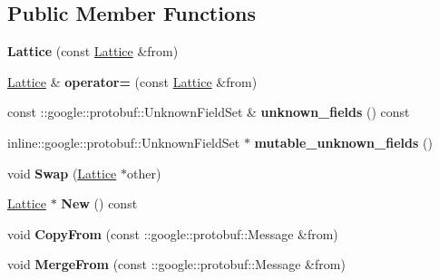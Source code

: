 \subsection*{Public Member Functions}
\begin{DoxyCompactItemize}
\item 
\hypertarget{classlattice_1_1Lattice_a6afe3eb36c5fa648ee09ff3425544a9f}{
{\bfseries Lattice} (const \hyperlink{classlattice_1_1Lattice}{Lattice} \&from)}
\label{classlattice_1_1Lattice_a6afe3eb36c5fa648ee09ff3425544a9f}

\item 
\hypertarget{classlattice_1_1Lattice_aaa4fc56dd3fca09222c685f78e2c5632}{
\hyperlink{classlattice_1_1Lattice}{Lattice} \& {\bfseries operator=} (const \hyperlink{classlattice_1_1Lattice}{Lattice} \&from)}
\label{classlattice_1_1Lattice_aaa4fc56dd3fca09222c685f78e2c5632}

\item 
\hypertarget{classlattice_1_1Lattice_afc9d0408a25d079574a8da841f4d2580}{
const ::google::protobuf::UnknownFieldSet \& {\bfseries unknown\_\-fields} () const }
\label{classlattice_1_1Lattice_afc9d0408a25d079574a8da841f4d2580}

\item 
\hypertarget{classlattice_1_1Lattice_a5581cb64b246c378c56bb2d686e42132}{
inline::google::protobuf::UnknownFieldSet $\ast$ {\bfseries mutable\_\-unknown\_\-fields} ()}
\label{classlattice_1_1Lattice_a5581cb64b246c378c56bb2d686e42132}

\item 
\hypertarget{classlattice_1_1Lattice_ab4a3958ab2281dfb4677e6b7998b5ff3}{
void {\bfseries Swap} (\hyperlink{classlattice_1_1Lattice}{Lattice} $\ast$other)}
\label{classlattice_1_1Lattice_ab4a3958ab2281dfb4677e6b7998b5ff3}

\item 
\hypertarget{classlattice_1_1Lattice_a1162b6e64c44e5b7fdcacfe839c72dfa}{
\hyperlink{classlattice_1_1Lattice}{Lattice} $\ast$ {\bfseries New} () const }
\label{classlattice_1_1Lattice_a1162b6e64c44e5b7fdcacfe839c72dfa}

\item 
\hypertarget{classlattice_1_1Lattice_a9aec9f61f02b520348f5b4e661f779ac}{
void {\bfseries CopyFrom} (const ::google::protobuf::Message \&from)}
\label{classlattice_1_1Lattice_a9aec9f61f02b520348f5b4e661f779ac}

\item 
\hypertarget{classlattice_1_1Lattice_a62644d01e4c7fc503661a3ac7a4461aa}{
void {\bfseries MergeFrom} (const ::google::protobuf::Message \&from)}
\label{classlattice_1_1Lattice_a62644d01e4c7fc503661a3ac7a4461aa}


\end{DoxyCompactItemize}
